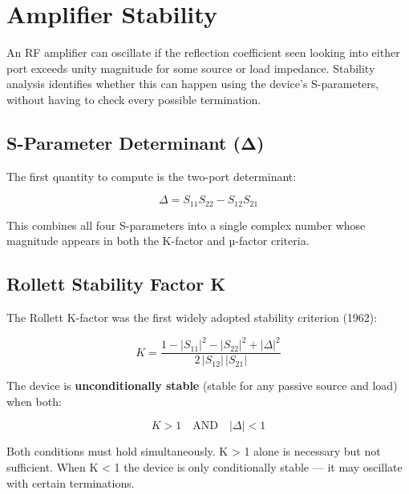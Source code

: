\section{Amplifier Stability}\label{sec:wiki_amp_stability}



An RF amplifier can oscillate if the reflection coefficient seen looking into either port exceeds unity magnitude for some source or load impedance. Stability analysis identifies whether this can happen using the device's S-parameters, without having to check every possible termination.

				

\subsection{S-Parameter Determinant (Δ)}

				

The first quantity to compute is the two-port determinant:

				
\[\Delta = S_{11}S_{22} - S_{12}S_{21}\]

				

This combines all four S-parameters into a single complex number whose magnitude appears in both the K-factor and µ-factor criteria.

				

\subsection{Rollett Stability Factor K}

				

The Rollett K-factor was the first widely adopted stability criterion (1962):

				
\[K = \dfrac{1 - |S_{11}|^2 - |S_{22}|^2 + |\Delta|^2}{2\,|S_{12}|\,|S_{21}|}\]

				

The device is \textbf{unconditionally stable} (stable for any passive source and load) when both:

				
\[K > 1 \quad \text{AND} \quad |\Delta| < 1\]

				

Both conditions must hold simultaneously. K \textgreater{} 1 alone is necessary but not sufficient. When K \textless{} 1 the device is only conditionally stable — it may oscillate with certain terminations.

				

